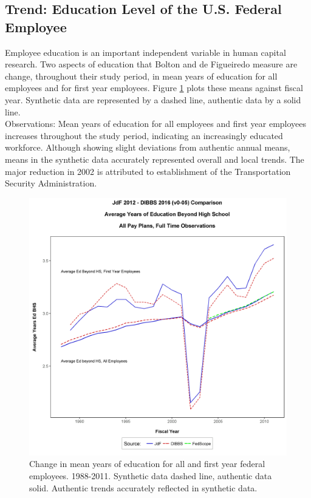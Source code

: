 \documentclass[10pt, letterpaper]{article}
\begin{document}
\begin{spacing}{1.0}
\clearpage

\subsection{Trend:  Education Level of the U.S. Federal Employee}

Employee education is an important independent variable in human capital research.  Two aspects of education that Bolton and de Figueiredo measure are change, throughout their study period, in mean years of education for all employees and for first year employees.  Figure \ref{figure:EdVsFYAllPayPlans} plots these means against fiscal year.   Synthetic data are represented by a dashed line, authentic data by a solid line.\\

Observations:  Mean years of education for all employees and first year employees increases throughout the study period, indicating an increasingly educated workforce.  Although showing slight deviations from authentic annual means, means in the synthetic data accurately represented overall and local trends.  The major reduction in 2002 is attributed to establishment of the Transportation Security Administration.\\

\vspace{20pt}

\begin{figure}[h]
    \centering
    \includegraphics[width=6in, trim={0 0.6in 0 1in}, clip]{EdVsFYAllPayPlans.png}
    \caption{Change in mean years of education for all and first year federal employees.  1988-2011.  Synthetic data dashed line, authentic data solid.  Authentic trends accurately reflected in synthetic data.}
    \label{figure:EdVsFYAllPayPlans}
\end{figure}


\end{spacing}
\end{document}
